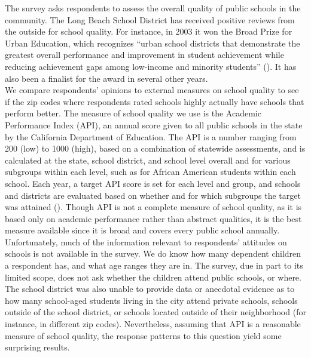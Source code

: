 The survey asks respondents to assess the overall quality of public schools in the community.  The Long Beach School District has received positive reviews from the outside for school quality.  For instance, in 2003 it won the Broad Prize for Urban Education, which recognizes ``urban school districts that demonstrate the greatest overall performance and improvement in student achievement while reducing achievement gaps among low-income and minority students'' (\citealt{BroadPrize}).  It has also been a finalist for the award in several other years.\\ 
\indent
We compare respondents' opinions to external measures on school quality to see if the zip codes where respondents rated schools highly actually have schools that perform better.  The measure of school quality we use is the Academic Performance Index (API), an annual score given to all public schools in the state by the California Department of Education.  The API is a number ranging from 200 (low) to 1000 (high), based on a combination of statewide assessments, and is calculated at the state, school district, and school level overall and for various subgroups within each level, such as for African American students within each school.  Each year, a target API score is set for each level and group, and schools and districts are evaluated based on whether and for which subgroups the target was attained (\citealt{CADoE}).  Though API is not a complete measure of school quality, as it is based only on academic performance rather than abstract qualities, it is the best measure available since it is broad and covers every public school annually.\\
\indent 
Unfortunately, much of the information relevant to respondents' attitudes on schools is not available in the survey.  We do know how many dependent children a respondent has, and what age ranges they are in.  The survey, due in part to its limited scope, does not ask whether the children attend public schools, or where.  The school district was also unable to provide data or anecdotal evidence as to how many school-aged students living in the city attend private schools, schools outside of the school district, or schools located outside of their neighborhood (for instance, in different zip codes).  Nevertheless, assuming that API is a reasonable measure of school quality, the response patterns to this question yield some surprising results.\\
\indent
